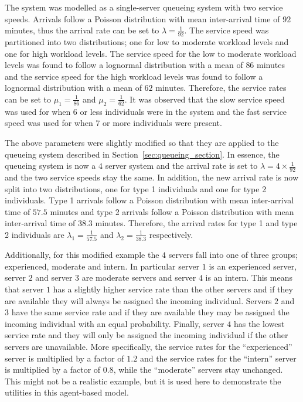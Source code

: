 The system was modelled as a single-server queueing system with two service
speeds.
Arrivals follow a Poisson distribution with mean inter-arrival time
of \(92\) minutes, thus the arrival rate can be set to
\(\lambda = \frac{1}{92}\).
The service speed was partitioned into two distributions; one for low to
moderate workload levels and one for high workload levels.
The service speed for the low to moderate workload levels was found to follow
a lognormal distribution with a mean of \(86\) minutes and the service speed for
the high workload levels was found to follow a lognormal distribution
with a mean of \(62\) minutes.
Therefore, the service rates can be set to \(\mu_1 = \frac{1}{86}\) and
\(\mu_2 = \frac{1}{62}\).
It was observed that the slow service speed was used for when \(6\) or less
individuals were in the system and the fast service speed was used for when
\(7\) or more individuals were present. 

The above parameters were slightly modified so that they are applied to the
queueing system described in Section~\ref{sec:queueing_section}.
In essence, the queueing system is now a \(4\) server system and the arrival
rate is set to \(\lambda = 4 \times \frac{1}{92}\) and the two service speeds
stay the same.
In addition, the new arrival rate is now split into two distributions, one for
type 1 individuals and one for type 2 individuals.
Type 1 arrivals follow a Poisson distribution with mean inter-arrival time
of \(57.5\) minutes and type 2 arrivals follow a Poisson distribution with mean
inter-arrival time of \(38.3\) minutes.
Therefore, the arrival rates for type 1 and type 2 individuals are
\(\lambda_1 = \frac{1}{57.5}\) and \(\lambda_2 = \frac{1}{38.3}\) respectively.

Additionally, for this modified example the \(4\) servers fall into one of
three groups; experienced, moderate and intern.
In particular server \(1\) is an experienced server, server \(2\) and server
\(3\) are moderate servers and server \(4\) is an intern.
This means that server \(1\) has a slightly higher service rate than the other
servers and if they are available they will always be assigned the incoming
individual.
Servers \(2\) and \(3\) have the same service rate and if they are available
they may be assigned the incoming individual with an equal probability.
Finally, server \(4\) has the lowest service rate and they will only be
assigned the incoming individual if the other servers are unavailable.
More specifically, the service rates for the ``experienced'' server is
multiplied by a factor of \(1.2\) and the service rates for the ``intern''
server is multiplied by a factor of \(0.8\), while the ``moderate'' servers
stay unchanged.
This might not be a realistic example, but it is used here to demonstrate the
utilities in this agent-based model.

